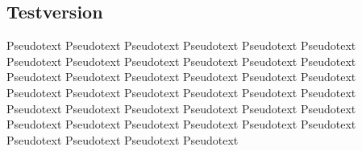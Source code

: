 \subsection{Testversion}
\label{kap:AnzugTestversion}
Pseudotext Pseudotext Pseudotext Pseudotext Pseudotext Pseudotext Pseudotext Pseudotext Pseudotext Pseudotext Pseudotext Pseudotext Pseudotext Pseudotext Pseudotext Pseudotext Pseudotext Pseudotext Pseudotext Pseudotext Pseudotext Pseudotext Pseudotext Pseudotext Pseudotext Pseudotext Pseudotext Pseudotext Pseudotext Pseudotext Pseudotext Pseudotext Pseudotext Pseudotext Pseudotext Pseudotext Pseudotext Pseudotext Pseudotext Pseudotext 